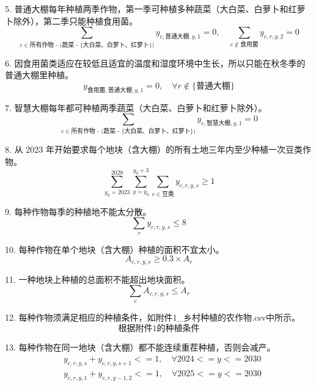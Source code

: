 \documentclass[withoutpreface]{cumcmthesis}
\begin{document}
5. 普通大棚每年种植两季作物，第一季可种植多种蔬菜（大白菜、白萝卜和红萝卜除外），第二季只能种植食用菌。
   \begin{equation}
    \sum_{c \in \text{所有作物 - (蔬菜 - \{大白菜、白萝卜、红萝卜\})}} y_{c,\text{普通大棚},y,1} = 0, \quad \sum_{c \notin \text{食用菌}} y_{c,r,y,2} = 0
   \end{equation}

6. 因食用菌类适应在较低且适宜的温度和湿度环境中生长，所以只能在秋冬季的普通大棚里种植。
   \begin{equation}
    y_{\text{食用菌},\text{普通大棚},y,1} = 0, \quad \forall r \notin \{\text{普通大棚}\}
   \end{equation}

7. 智慧大棚每年都可种植两季蔬菜（大白菜、白萝卜和红萝卜除外）。
   \begin{equation}
    \sum_{c \in \text{所有作物 - (蔬菜 - \{大白菜、白萝卜、红萝卜\})}} y_{c,\text{智慧大棚},y,1} = 0
   \end{equation}

8. 从 2023 年开始要求每个地块（含大棚）的所有土地三年内至少种植一次豆类作物。
   \begin{equation}
   \sum_{y_0=2023}^{2028}  \sum_{y = y_0}^{y_0 + 3} \sum_{c \in \text{豆类}} y_{c,r,y,s} \geq 1
   \end{equation}

9. 每种作物每季的种植地不能太分散。
   \begin{equation}
   \sum_{r} y_{c,r,y,s} \leq 8
   \end{equation}

10. 每种作物在单个地块（含大棚）种植的面积不宜太小。
    \begin{equation}
    A_{c,r,y,s} \geq 0.3 \times A_r
    \end{equation}

11. 一种地块上种植的总面积不能超出地块面积。
    \begin{equation}
    \sum_{c} A_{c,r,y,s} \leq A_r
    \end{equation}

12. 每种作物须满足相应的种植条件，如附件1\_乡村种植的农作物.csv中所示。
    \begin{equation}
    \text{根据附件1的种植条件}
    \end{equation}

13. 每种作物在同一地块（含大棚）都不能连续重茬种植，否则会减产。
    \begin{align}
    &y_{c,r,y,s} + y_{c,r,y,s+1} <= 1, \quad \forall 2024 <= y <= 2030 \quad  \\ \quad &y_{c,r,y,1} + y_{c,r,y-1,2} <= 1, \quad \forall 2025 <= y <= 2030
    \end{align}
\end{document}
